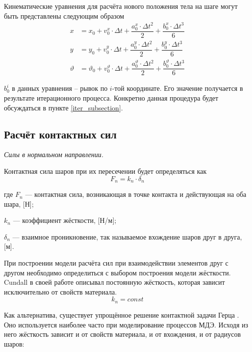 \documentclass[utf8x, 14pt, oneside, a4paper]{article}
\begin{document}
Кинематические уравнения для расчёта нового положения тела на шаге могут быть представлены следующим образом
\begin{align}
x &= x_0 + v^x_0 \cdot \Delta t + \dfrac{a^x_0 \cdot \Delta t^2}{2} + \dfrac{b^x_0 \cdot \Delta t^3}{6}\\
y &= y_0 + v^y_0 \cdot \Delta t + \dfrac{a^y_0 \cdot \Delta t^2}{2} + \dfrac{b^y_0 \cdot \Delta t^3}{6}\\
\vartheta &= \vartheta_0 + v^{\vartheta}_0 \cdot \Delta t + \dfrac{a^{\vartheta}_0 \cdot \Delta t^2}{2} + \dfrac{b^{\vartheta}_0 \cdot \Delta t^3}{6}
\end{align}

$b_0^i$ в данных уравнения -- рывок по $i$-той координате. 
Его значение получается в результате итерационного процесса.
Конкретно данная процедура будет обсуждаться в пункте \ref{iter_subsection}.



\subsection{Расчёт контактных сил}
\label{force_subsection}

\textit{Силы в нормальном направлении.}

Контактная сила шаров при их пересечении будет определяться как
\begin{equation}
\label{norm_force}
F_n = k_n \cdot \delta_n
\end{equation}

где $F_n$ --- контактная сила, возникающая в точке контакта и действующая на оба шара, [Н];

$k_n$ --- коэффициент жёсткости, [Н/м];

$\delta_n$ --- взаимное проникновение, так называемое вхождение шаров друг в друга, [м].

При построении модели расчёта сил при взаимодействии элементов друг с другом необходимо определиться с выбором построения модели жёсткости. 
Cundall в своей работе \cite{cundall} описывал постоянную жёсткость, которая зависит исключительно от свойств материала.
\begin{equation}
\label{kn_const}
k_n = const
\end{equation}


Как альтернатива, существует упрощённое решение контактной задачи Герца \cite{friction_calibration}.
Оно используется наиболее часто при моделирование процессов МДЭ.
Исходя из него жёсткость зависит и от свойств материала, и от вхождения, и от радиусов шаров:
\end{document}
